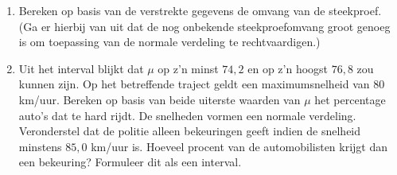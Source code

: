 \begin{enumerate}[label=(\alph*)]
    \item Bereken op basis van de verstrekte gegevens de omvang van de steekproef.
    (Ga er hierbij van uit dat de nog onbekende steekproefomvang groot genoeg is om toepassing van de normale verdeling te rechtvaardigen.)
    \answer{

    }

    \item Uit het interval blijkt dat $\mu$ op z'n minst $74,2$ en op z'n hoogst $76,8$ zou kunnen zijn.
    Op het betreffende traject geldt een maximumsnelheid van $80$ km/uur.
    Bereken op basis van beide uiterste waarden van $\mu$ het percentage auto's dat te hard rijdt.
    De snelheden vormen een normale verdeling.
    Veronderstel dat de politie alleen bekeuringen geeft indien de snelheid minstens $85,0$ km/uur is.
    Hoeveel procent van de automobilisten krijgt dan een bekeuring?
    Formuleer dit als een interval.
    \answer{

    }
\end{enumerate}
